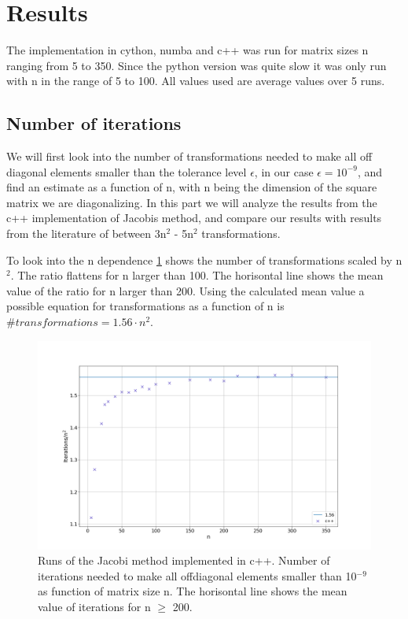 \section{Results}

The implementation in cython, numba and c++ was run for matrix sizes n ranging from 5
to 350. Since the python version was quite slow it was only run with n in the
range of 5 to 100. All values used are average values over 5 runs.


\subsection{Number of iterations}

We will first look into the number of transformations needed to make all off
diagonal elements smaller than the tolerance level $\epsilon$, in our case
$\epsilon = 10^{-9}$, and find an estimate as a function of n, with n being the
dimension of the square matrix we are diagonalizing. In this part we will
analyze the results from the c++ implementation of Jacobis method, and compare
our results with results from the literature of between 3n$^2$ - 5n$^2$ \cite{lectures}
transformations.

To look into the n dependence \cref{fig:iterations_scaled} shows the number of
transformations scaled by n$^2$. The ratio flattens for n larger than 100. The
horisontal line shows the mean value of the ratio for n larger than 200. Using
the calculated mean value a possible equation for transformations as a function
of n is $\#transformations = 1.56\cdot n^2$.

\begin{figure}[H]
  \centering
  \includegraphics[width=1.0\textwidth]{../figures/iterations_compare_n2.png}
  \caption{Runs of the Jacobi method implemented in c++. Number of iterations
  needed to make all offdiagonal elements smaller than 10$^{-9}$ as function of
  matrix size n. The horisontal line shows the mean value of iterations for
  n $\geq$ 200.}

  \label{fig:iterations_scaled}
\end{figure}


